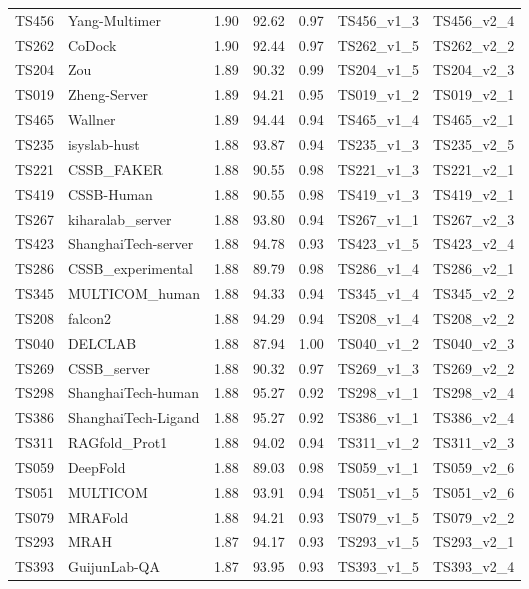 \begin{longtable}{lllllll}
TS456 & Yang-Multimer & 1.90 & 92.62 & 0.97 & TS456\_v1\_3 & TS456\_v2\_4 \\ 
TS262 & CoDock & 1.90 & 92.44 & 0.97 & TS262\_v1\_5 & TS262\_v2\_2 \\ 
TS204 & Zou & 1.89 & 90.32 & 0.99 & TS204\_v1\_5 & TS204\_v2\_3 \\ 
TS019 & Zheng-Server & 1.89 & 94.21 & 0.95 & TS019\_v1\_2 & TS019\_v2\_1 \\ 
TS465 & Wallner & 1.89 & 94.44 & 0.94 & TS465\_v1\_4 & TS465\_v2\_1 \\ 
TS235 & isyslab-hust & 1.88 & 93.87 & 0.94 & TS235\_v1\_3 & TS235\_v2\_5 \\ 
TS221 & CSSB\_FAKER & 1.88 & 90.55 & 0.98 & TS221\_v1\_3 & TS221\_v2\_1 \\ 
TS419 & CSSB-Human & 1.88 & 90.55 & 0.98 & TS419\_v1\_3 & TS419\_v2\_1 \\ 
TS267 & kiharalab\_server & 1.88 & 93.80 & 0.94 & TS267\_v1\_1 & TS267\_v2\_3 \\ 
TS423 & ShanghaiTech-server & 1.88 & 94.78 & 0.93 & TS423\_v1\_5 & TS423\_v2\_4 \\ 
TS286 & CSSB\_experimental & 1.88 & 89.79 & 0.98 & TS286\_v1\_4 & TS286\_v2\_1 \\ 
TS345 & MULTICOM\_human & 1.88 & 94.33 & 0.94 & TS345\_v1\_4 & TS345\_v2\_2 \\ 
TS208 & falcon2 & 1.88 & 94.29 & 0.94 & TS208\_v1\_4 & TS208\_v2\_2 \\ 
TS040 & DELCLAB & 1.88 & 87.94 & 1.00 & TS040\_v1\_2 & TS040\_v2\_3 \\ 
TS269 & CSSB\_server & 1.88 & 90.32 & 0.97 & TS269\_v1\_3 & TS269\_v2\_2 \\ 
TS298 & ShanghaiTech-human & 1.88 & 95.27 & 0.92 & TS298\_v1\_1 & TS298\_v2\_4 \\ 
TS386 & ShanghaiTech-Ligand & 1.88 & 95.27 & 0.92 & TS386\_v1\_1 & TS386\_v2\_4 \\ 
TS311 & RAGfold\_Prot1 & 1.88 & 94.02 & 0.94 & TS311\_v1\_2 & TS311\_v2\_3 \\ 
TS059 & DeepFold & 1.88 & 89.03 & 0.98 & TS059\_v1\_1 & TS059\_v2\_6 \\ 
TS051 & MULTICOM & 1.88 & 93.91 & 0.94 & TS051\_v1\_5 & TS051\_v2\_6 \\ 
TS079 & MRAFold & 1.88 & 94.21 & 0.93 & TS079\_v1\_5 & TS079\_v2\_2 \\ 
TS293 & MRAH & 1.87 & 94.17 & 0.93 & TS293\_v1\_5 & TS293\_v2\_1 \\ 
TS393 & GuijunLab-QA & 1.87 & 93.95 & 0.93 & TS393\_v1\_5 & TS393\_v2\_4 \\ 

\end{longtable}
